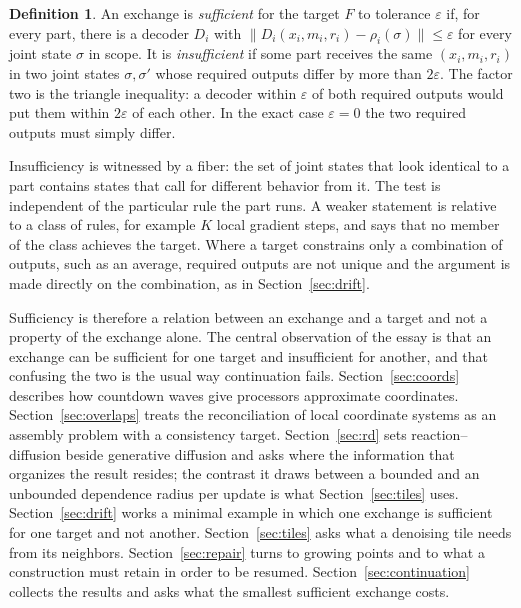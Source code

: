 \documentclass[11pt]{article}
\theoremstyle{definition}
\newtheorem{definition}{Definition}
\theoremstyle{plain}
\theoremstyle{remark}
\begin{document}
\begin{definition}
An exchange is \emph{sufficient} for the target $F$ to tolerance $\varepsilon$ if, for every part, there is a decoder $D_i$ with $\|D_i(x_i,m_i,r_i)-\rho_i(\sigma)\|\le\varepsilon$ for every joint state $\sigma$ in scope. It is \emph{insufficient} if some part receives the same $(x_i,m_i,r_i)$ in two joint states $\sigma,\sigma'$ whose required outputs differ by more than $2\varepsilon$. The factor two is the triangle inequality: a decoder within $\varepsilon$ of both required outputs would put them within $2\varepsilon$ of each other. In the exact case $\varepsilon=0$ the two required outputs must simply differ.
\end{definition}

Insufficiency is witnessed by a fiber: the set of joint states that look identical to a part contains states that call for different behavior from it. The test is independent of the particular rule the part runs. A weaker statement is relative to a class of rules, for example $K$ local gradient steps, and says that no member of the class achieves the target. Where a target constrains only a combination of outputs, such as an average, required outputs are not unique and the argument is made directly on the combination, as in Section~\ref{sec:drift}.

Sufficiency is therefore a relation between an exchange and a target and not a property of the exchange alone. The central observation of the essay is that an exchange can be sufficient for one target and insufficient for another, and that confusing the two is the usual way continuation fails. Section~\ref{sec:coords} describes how countdown waves give processors approximate coordinates. Section~\ref{sec:overlaps} treats the reconciliation of local coordinate systems as an assembly problem with a consistency target. Section~\ref{sec:rd} sets reaction--diffusion beside generative diffusion and asks where the information that organizes the result resides; the contrast it draws between a bounded and an unbounded dependence radius per update is what Section~\ref{sec:tiles} uses. Section~\ref{sec:drift} works a minimal example in which one exchange is sufficient for one target and not another. Section~\ref{sec:tiles} asks what a denoising tile needs from its neighbors. Section~\ref{sec:repair} turns to growing points and to what a construction must retain in order to be resumed. Section~\ref{sec:continuation} collects the results and asks what the smallest sufficient exchange costs.
\end{document}

